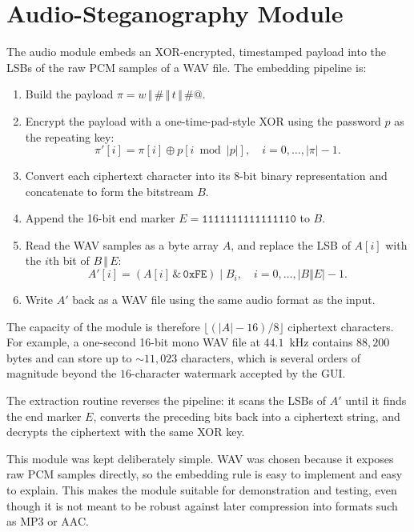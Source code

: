 \section{Audio-Steganography Module}
\label{sec:audio_module}

The audio module embeds an XOR-encrypted, timestamped payload into the LSBs of the raw PCM samples of a WAV file. The embedding pipeline is:

\begin{enumerate}[label=(\arabic*)]
    \item Build the payload $\pi = w \,\Vert\, \texttt{\#} \,\Vert\, t \,\Vert\, \texttt{\#@}$.
    \item Encrypt the payload with a one-time-pad-style XOR using the password $p$ as the repeating key:
    \[
        \pi'[i] = \pi[i] \oplus p[i \bmod |p|], \quad i = 0, \ldots, |\pi| - 1.
    \]
    \item Convert each ciphertext character into its 8-bit binary representation and concatenate to form the bitstream $B$.
    \item Append the 16-bit end marker $E = \texttt{1111111111111110}$ to $B$.
    \item Read the WAV samples as a byte array $A$, and replace the LSB of $A[i]$ with the $i$th bit of $B \,\Vert\, E$:
    \[
        A'[i] = (A[i] \,\&\, \mathtt{0xFE}) \mid B_i, \quad i = 0, \ldots, |B \Vert E| - 1.
    \]
    \item Write $A'$ back as a WAV file using the same audio format as the input.
\end{enumerate}

The capacity of the module is therefore $\lfloor (|A| - 16)/8 \rfloor$ ciphertext characters. For example, a one-second 16-bit mono WAV file at $44.1$~kHz contains $88{,}200$ bytes and can store up to $\sim 11{,}023$ characters, which is several orders of magnitude beyond the $16$-character watermark accepted by the GUI.

The extraction routine reverses the pipeline: it scans the LSBs of $A'$ until it finds the end marker $E$, converts the preceding bits back into a ciphertext string, and decrypts the ciphertext with the same XOR key.

This module was kept deliberately simple. WAV was chosen because it exposes raw PCM samples directly, so the embedding rule is easy to implement and easy to explain. This makes the module suitable for demonstration and testing, even though it is not meant to be robust against later compression into formats such as MP3 or AAC.

